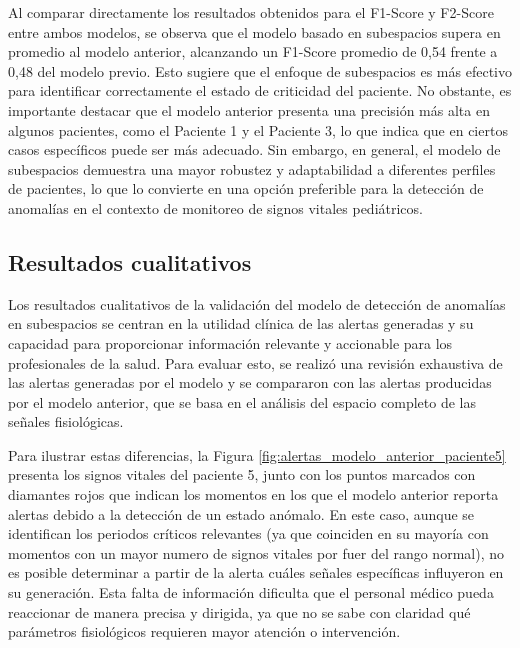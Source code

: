 Al comparar directamente los resultados obtenidos para el F1-Score y F2-Score entre ambos modelos, se observa que el modelo basado en subespacios supera en promedio al modelo anterior, alcanzando un F1-Score promedio de 0,54 frente a 0,48 del modelo previo. Esto sugiere que el enfoque de subespacios es más efectivo para identificar correctamente el estado de criticidad del paciente. No obstante, es importante destacar que el modelo anterior presenta una precisión más alta en algunos pacientes, como el Paciente 1 y el Paciente 3, lo que indica que en ciertos casos específicos puede ser más adecuado. Sin embargo, en general, el modelo de subespacios demuestra una mayor robustez y adaptabilidad a diferentes perfiles de pacientes, lo que lo convierte en una opción preferible para la detección de anomalías en el contexto de monitoreo de signos vitales pediátricos.

\subsection{Resultados cualitativos}

Los resultados cualitativos de la validación del modelo de detección de anomalías en subespacios se centran en la utilidad clínica de las alertas generadas y su capacidad para proporcionar información relevante y accionable para los profesionales de la salud. Para evaluar esto, se realizó una revisión exhaustiva de las alertas generadas por el modelo y se compararon con las alertas producidas por el modelo anterior, que se basa en el análisis del espacio completo de las señales fisiológicas.

Para ilustrar estas diferencias, la Figura \ref{fig:alertas_modelo_anterior_paciente5} presenta los signos vitales del paciente 5, junto con los puntos marcados con diamantes rojos que indican los momentos en los que el modelo anterior reporta alertas debido a la detección de un estado anómalo. En este caso, aunque se identifican los periodos críticos relevantes (ya que coinciden en su mayoría con momentos con un mayor numero de signos vitales por fuer del rango normal), no es posible determinar a partir de la alerta cuáles señales específicas influyeron en su generación. Esta falta de información dificulta que el personal médico pueda reaccionar de manera precisa y dirigida, ya que no se sabe con claridad qué parámetros fisiológicos requieren mayor atención o intervención.

